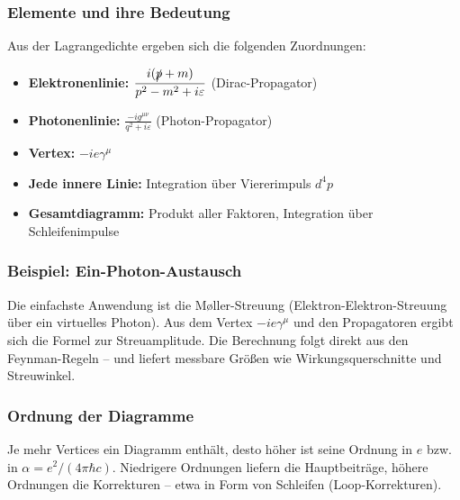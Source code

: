\subsubsection*{Elemente und ihre Bedeutung}
Aus der Lagrangedichte ergeben sich die folgenden Zuordnungen:

\vspace{0.5em}
\begin{tcolorbox}[mathebox, title=Feynman-Regeln der QED (vereinfacht)]
	\label{box:Feynman-Regeln der QED}
	\begin{itemize}
		\item \textbf{Elektronenlinie:} $\displaystyle \frac{i(\slashed{p} + m)}{p^2 - m^2 + i\varepsilon}$ (Dirac-Propagator)
		\item \textbf{Photonenlinie:} $\displaystyle \frac{-ig^{\mu\nu}}{q^2 + i\varepsilon}$ (Photon-Propagator)
		\item \textbf{Vertex:} $-ie\gamma^\mu$
		\item \textbf{Jede innere Linie:} Integration über Viererimpuls $d^4p$
		\item \textbf{Gesamtdiagramm:} Produkt aller Faktoren, Integration über Schleifenimpulse
	\end{itemize}
\end{tcolorbox}

\subsubsection*{Beispiel: Ein-Photon-Austausch}
Die einfachste Anwendung ist die Møller-Streuung (Elektron-Elektron-Streuung über ein virtuelles Photon). Aus dem Vertex $-ie\gamma^\mu$ und den Propagatoren ergibt sich die Formel zur Streuamplitude. Die Berechnung folgt direkt aus den Feynman-Regeln – und liefert messbare Größen wie Wirkungsquerschnitte und Streuwinkel.

\subsubsection*{Ordnung der Diagramme}
Je mehr Vertices ein Diagramm enthält, desto höher ist seine Ordnung in $e$ bzw. in $\alpha = e^2 / (4\pi\hbar c)$. Niedrigere Ordnungen liefern die Hauptbeiträge, höhere Ordnungen die Korrekturen – etwa in Form von Schleifen (Loop-Korrekturen).

